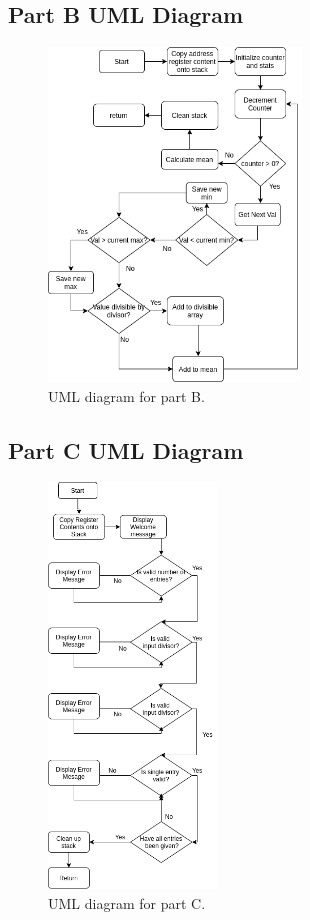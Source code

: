 \documentclass[10pt, letterpaper, titlepage]{article} %
\begin{document}
\subsection{Part B UML Diagram}
\begin{figure}[H]
   \includegraphics[width=0.6\textwidth]{UMLB.png}
   \centering  
   \caption{UML diagram for part B.} 
   \label{figure:2}
\end{figure}

\subsection{Part C UML Diagram}
\begin{figure}[H]
   \includegraphics[width=0.4\textwidth]{UMLA.png}
   \centering  
   \caption{UML diagram for part C.} 
   \label{figure:3}
\end{figure}
\end{document}
